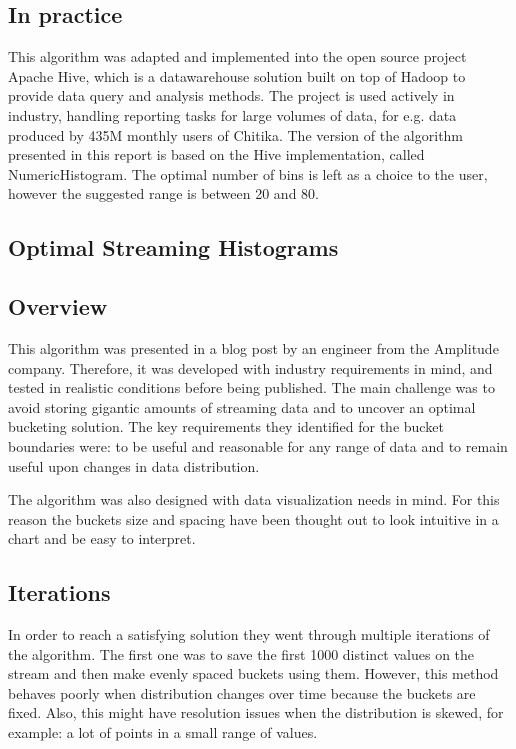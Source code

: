 \documentclass[12pt]{article}
\begin{document}
	\subsection{In practice}
	This algorithm was adapted and implemented into the open source project Apache 
	Hive\cite{Thusoo:2009:HWS:1687553.1687609}, which is a datawarehouse solution 
	built on top of Hadoop to provide data query and analysis methods. The project 
	is used actively in industry, handling reporting tasks for large volumes of data,
	for e.g. data produced by 435M monthly users of Chitika\cite{HivePoweredBy}.
	The version of the algorithm presented in this report is based on the Hive 
	implementation, called NumericHistogram\cite{HiveImplementation}. The optimal 
	number of bins is left as a choice to the user, however the suggested range 
	is between 20 and 80.


	\subsection{Optimal Streaming Histograms}
	\subsection{Overview}
	This algorithm was presented in a blog post\cite{OSHistograms} 
	by an engineer from the Amplitude company. Therefore, it was developed 
	with industry requirements in mind, and tested in realistic conditions 
	before being published. The main challenge was to avoid storing gigantic 
	amounts of streaming data and to uncover an optimal bucketing solution.
	The key requirements they identified for the bucket boundaries were:
	to be useful and reasonable for any range of data and to remain 
	useful upon changes in data distribution.
	
	The algorithm was also designed with data visualization needs in mind. 
	For this reason the buckets size and spacing have been thought out to 
	look intuitive in a chart and be easy to interpret.

	\subsection{Iterations}
	In order to reach a satisfying solution they went through multiple iterations 
	of the algorithm. The first one was to save the first 1000 distinct values 
	on the stream and then make evenly spaced buckets using them. However, this 
	method behaves poorly when distribution changes over time because the buckets 
	are fixed. Also, this might have resolution issues when the distribution 
	is skewed, for example: a lot of points in a small range of values. 
	
\end{document}
